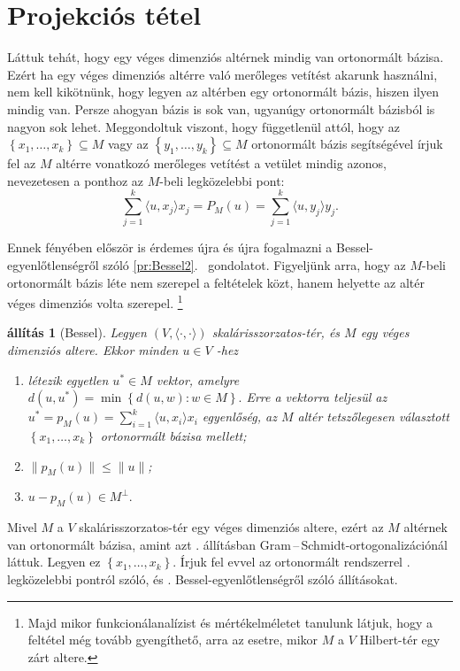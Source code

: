\documentclass[a4paper, showtrims]{memoir}
\makeatletter
\renewenvironment{proof}[1][\proofname]
    {\par\pushQED{\qed}%
    \normalfont \topsep6\p@\@plus6\p@\relax
    \trivlist
    \item[\hskip\labelsep
        \itshape
    #1\@addpunct{:}]\ignorespaces}
    {\popQED\endtrivlist\@endpefalse}
\theoremstyle{plain}
\newtheorem{proposition}{állítás}[chapter]
\theoremstyle{remark}
\theoremstyle{definition}
\newcommand{\ip}[2]{\langle#1,#2\rangle}
\makeatother
\begin{document}
\section{Projekciós tétel}
Láttuk tehát, hogy egy véges dimenziós altérnek mindig van ortonormált bázisa.
Ezért ha egy véges dimenziós altérre való merőleges vetítést akarunk használni,
nem kell kikötnünk, hogy legyen az altérben egy ortonormált bázis, hiszen ilyen mindig van.
Persze ahogyan bázis is sok van, ugyanúgy ortonormált bázisból is nagyon sok lehet.
Meggondoltuk viszont, hogy függetlenül attól, hogy az $\left\{ x_1,\ldots,x_k \right\}\subseteq M$
vagy az $\left\{ y_1,\ldots,y_k \right\}\subseteq M$ ortonormált bázis segítségével írjuk fel az $M$
altérre vonatkozó merőleges vetítést a vetület mindig azonos, nevezetesen a ponthoz az $M$-beli legközelebbi pont:
\[
	\sum_{j=1}^{k}\ip{u}{x_j}x_j
	=
	P_M\left( u \right)
	=
	\sum_{j=1}^{k}\ip{u}{y_j}y_j.
\]

Ennek fényében először is érdemes újra és újra fogalmazni a Bessel-egyenlőtlenségről szóló \ref{pr:Bessel2}.~ gondolatot.
Figyeljünk arra, hogy az $M$-beli ortonormált bázis léte nem szerepel a feltételek közt,
hanem helyette az altér véges dimenziós volta szerepel.%
\footnote{Majd mikor funkcionálanalízist és mértékelméletet tanulunk látjuk, hogy a feltétel még tovább gyengíthető,
	arra az esetre, mikor $M$ a $V$ Hilbert-tér egy zárt altere.}
\begin{proposition}[Bessel]\label{pr:Bessel3}
	Legyen $\left( V,\ip{\cdot}{\cdot} \right)$ skalárisszorzatos-tér, és $M$ egy
	véges dimenziós altere.
	Ekkor minden $u\in V$ -hez
	\begin{enumerate}
		\item létezik egyetlen $u^\ast\in M$ vektor, amelyre
		      \(
		      d\left( u,u^\ast\right)
		      =
		      \min\left\{ d\left( u,w \right):w\in M \right\}.
		      \)
		      Erre a vektorra teljesül az $u^\ast=p_M\left( u \right)=\sum_{i=1}^k\ip{u}{x_i}x_i$ egyenlőség,
		      az $M$ altér tetszőlegesen választott  $\left\{ x_1,\ldots,x_k \right\}$ ortonormált bázisa mellett;
		\item
		      $\|p_M\left( u \right)\|\leq\|u\|$;
		\item
		      \(
		      u-p_M(u)\in M^\perp.
		      \)
		      \qedhere
	\end{enumerate}
\end{proposition}
\begin{proof}
	Mivel $M$ a $V$ skalárisszorzatos-tér egy véges dimenziós altere,
	ezért az $M$ altérnek van
    ortonormált bázisa, amint azt . állításban Gram\,--\,Schmidt-ortogonalizációnál láttuk.
	Legyen ez $\left\{ x_1,\ldots,x_k \right\}$.
    Írjuk fel evvel az ortonormált rendszerrel . legközelebbi pontról szóló,
    és . Bessel-egyen\-lőt\-lenség\-ről szóló állításokat.
\end{proof}
\end{document}

